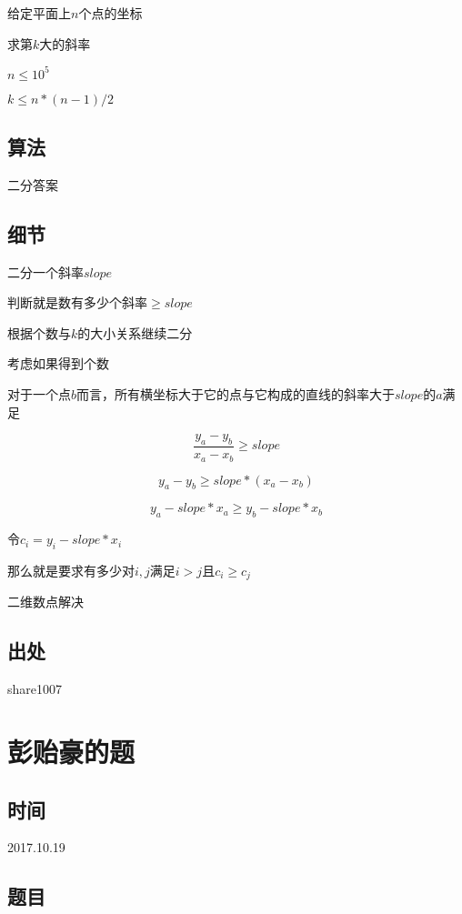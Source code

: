 \documentclass[a4paper]{article}
\begin{document}
		给定平面上$n$个点的坐标
		
		求第$k$大的斜率
		
		$n \leq 10^5 $
		
		$k \leq n * (n - 1) / 2$
		
	\subsection{算法}
		
		二分答案
		
	\subsection{细节}
		
		二分一个斜率$slope$
		
		判断就是数有多少个斜率$\geq slope$
		
		根据个数与$k$的大小关系继续二分
		
		考虑如果得到个数
		
		对于一个点$b$而言，所有横坐标大于它的点与它构成的直线的斜率大于$slope$的$a$满足
		
		$$\frac{y_a-y_b}{x_a-x_b} \geq slope$$
		
		$$y_a-y_b \geq slope * (x_a-x_b)$$
		
		$$y_a-slope * x_a \geq y_b - slope * x_b$$
		
		令$c_i=y_i - slope * x_i$
		
		那么就是要求有多少对$i,j$满足$i > j $且$c_i \geq c_j$
		
		二维数点解决
		
	\subsection{出处}
		
		share1007
	
	\newpage
	
	\section{彭贻豪的题}
		
	\subsection{时间}
		
		2017.10.19
		
	\subsection{题目}
		
\end{document}

